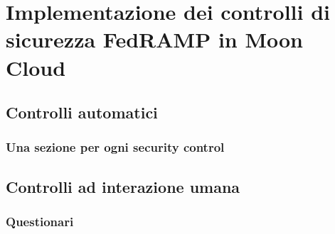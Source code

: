 \documentclass[../main.tex]{subfiles}
\begin{document}
\chapter{Implementazione dei controlli di sicurezza FedRAMP in Moon Cloud}
\section{Controlli automatici}
\subsection{Una sezione per ogni security control}
\section{Controlli ad interazione umana}
\subsection{Questionari}
\end{document}
